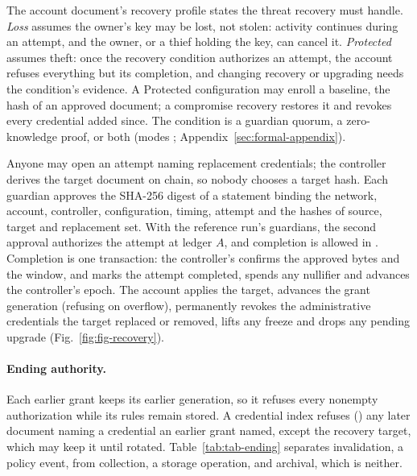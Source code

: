 The account document's recovery profile states the threat recovery must handle.
\emph{Loss} assumes the owner's key may be lost, not stolen: activity continues
during an attempt, and the owner, or a thief holding the key, can cancel it.
\emph{Protected} assumes theft: once the recovery condition authorizes an
attempt, the account refuses everything but its completion, and changing
recovery or upgrading needs the condition's evidence. A Protected configuration
may enroll a baseline, the hash of an approved document; a compromise recovery
restores it and revokes every credential added since. The condition is a guardian
quorum, a zero-knowledge proof, or both (modes ;
Appendix~\ref{sec:formal-appendix}).

Anyone may open an attempt naming replacement credentials; the controller derives
the target document on chain, so nobody chooses a target hash. Each guardian
approves the SHA-256 digest of a statement binding the network, account,
controller, configuration, timing, attempt and the hashes of source, target and
replacement set. With the reference run's 
guardians, the second approval authorizes the attempt at ledger $A$, and
completion is allowed in . Completion is one transaction:
the controller's  confirms the approved bytes and the window,
and  marks the attempt completed, spends any nullifier and
advances the controller's epoch. The account applies the target, advances the
grant generation (refusing on overflow), permanently revokes the administrative
credentials the target replaced or removed, lifts any freeze and drops any pending
upgrade (Fig.~\ref{fig:fig-recovery}).

\paragraph{Ending authority.} Each earlier grant keeps its earlier generation, so
it refuses every nonempty authorization while its rules remain stored. A
credential index refuses () any later document naming a
credential an earlier grant named, except the recovery target, which may keep it
until rotated. Table~\ref{tab:tab-ending} separates invalidation, a policy event,
from collection, a storage operation, and archival, which is neither.
